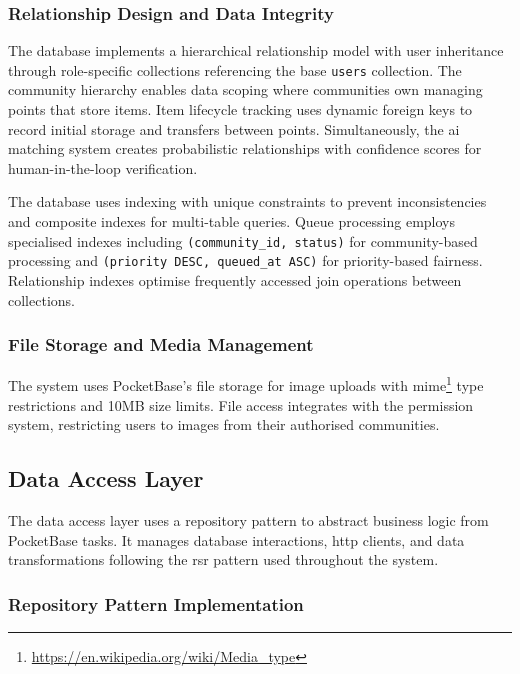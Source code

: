 \subsubsection{Relationship Design and Data Integrity}

The database implements a hierarchical relationship model with user inheritance through role-specific collections referencing the base \texttt{users} collection. The community hierarchy enables data scoping where communities own managing points that store items. Item lifecycle tracking uses dynamic foreign keys to record initial storage and transfers between points. Simultaneously, the \ac{ai} matching system creates probabilistic relationships with confidence scores for human-in-the-loop verification.

The database uses indexing with unique constraints to prevent inconsistencies and composite indexes for multi-table queries. Queue processing employs specialised indexes including \texttt{(community\_id, status)} for community-based processing and \texttt{(priority DESC, queued\_at ASC)} for priority-based fairness. Relationship indexes optimise frequently accessed join operations between collections.


\subsubsection{File Storage and Media Management}

The system uses PocketBase's file storage for image uploads with \ac{mime}\footnote{\url{https://en.wikipedia.org/wiki/Media_type}} type restrictions and 10MB size limits. File access integrates with the permission system, restricting users to images from their authorised communities.

\subsection{Data Access Layer} \label{subsection:data_access_layer}

The data access layer uses a repository pattern to abstract business logic from PocketBase tasks. It manages database interactions, \ac{http} clients, and data transformations following the \ac{rsr} pattern used throughout the system.

\subsubsection{Repository Pattern Implementation}

